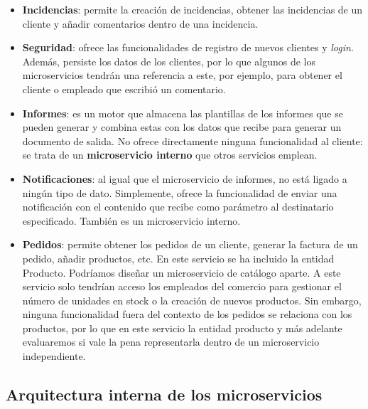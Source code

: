 \documentclass[11pt,spanish,listoffigures]{tfgetsinf}
\begin{document}
\begin{itemize}

\item \textbf{Incidencias}: permite la creación de incidencias, obtener las incidencias de un cliente y añadir comentarios dentro de una incidencia.

\item \textbf{Seguridad}: ofrece las funcionalidades de registro de nuevos clientes y \textit{login}. Además, persiste los datos de los clientes, por lo que algunos de los microservicios tendrán una referencia a este, por ejemplo, para obtener el cliente o empleado que escribió un comentario.

\item \textbf{Informes}: es un motor que almacena las plantillas de los informes que se pueden generar y combina estas con los datos que recibe para generar un documento de salida. No ofrece directamente ninguna funcionalidad al cliente: se trata de un \textbf{microservicio interno} que otros servicios emplean.

\item \textbf{Notificaciones}: al igual que el microservicio de informes, no está ligado a ningún tipo de dato. Simplemente, ofrece la funcionalidad de enviar una notificación con el contenido que recibe como parámetro al destinatario especificado. También es un microservicio interno.

\item \textbf{Pedidos}: permite obtener los pedidos de un cliente, generar la factura de un pedido, añadir productos, etc. En este servicio se ha incluido la entidad Producto. Podríamos diseñar un microservicio de catálogo aparte. A este servicio solo tendrían acceso los empleados del comercio para gestionar el número de unidades en stock o la creación de nuevos productos. Sin embargo, ninguna funcionalidad fuera del contexto de los pedidos se relaciona con los productos, por lo que en este servicio la entidad producto y más adelante evaluaremos si vale la pena representarla dentro de un microservicio independiente. 

\end{itemize}

\subsection{Arquitectura interna de los microservicios}
\end{document}
